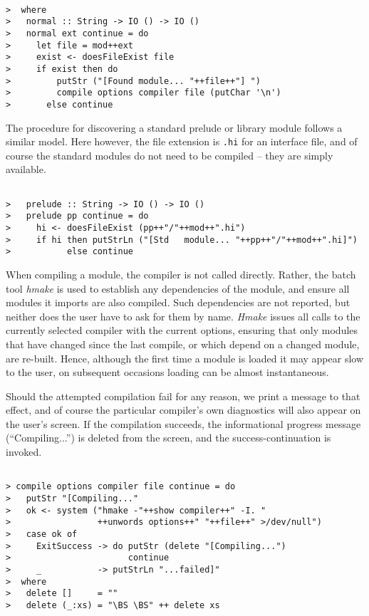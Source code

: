 \documentclass[a4paper]{article}
\begin{document}
\begin{verbatim}

>  where
>   normal :: String -> IO () -> IO ()
>   normal ext continue = do
>     let file = mod++ext
>     exist <- doesFileExist file
>     if exist then do
>         putStr ("[Found module... "++file++"] ")
>         compile options compiler file (putChar '\n')
>       else continue

\end{verbatim}

The procedure for discovering a standard prelude or library module
follows a similar model.   Here however, the file extension is
{\tt .hi} for an interface file, and of course the standard modules
do not need to be compiled -- they are simply available.

\begin{verbatim}

>   prelude :: String -> IO () -> IO ()
>   prelude pp continue = do
>     hi <- doesFileExist (pp++"/"++mod++".hi")
>     if hi then putStrLn ("[Std   module... "++pp++"/"++mod++".hi]")
>           else continue

\end{verbatim}

When compiling a module, the compiler is not called directly.  Rather,
the batch tool {\em hmake} is used to establish any dependencies of
the module, and ensure all modules it imports are also compiled.
Such dependencies are not reported, but neither does the user have to
ask for them by name.  {\em Hmake} issues all calls to the currently
selected compiler with the current options, ensuring that only
modules that have changed since the last compile, or which depend
on a changed module, are re-built.  Hence, although the first time
a module is loaded it may appear slow to the user, on subsequent
occasions loading can be almost instantaneous.

Should the attempted compilation fail for any reason, we print a
message to that effect, and of course the particular compiler's own
diagnostics will also appear on the user's screen.  If the compilation
succeeds, the informational progress message (``Compiling...'') is
deleted from the screen, and the success-continuation is invoked.

\begin{verbatim}

> compile options compiler file continue = do
>   putStr "[Compiling..."
>   ok <- system ("hmake -"++show compiler++" -I. "
>                 ++unwords options++" "++file++" >/dev/null")
>   case ok of
>     ExitSuccess -> do putStr (delete "[Compiling...")
>                       continue
>     _           -> putStrLn "...failed]"
>  where
>   delete []     = ""
>   delete (_:xs) = "\BS \BS" ++ delete xs

\end{verbatim}
\end{document}
